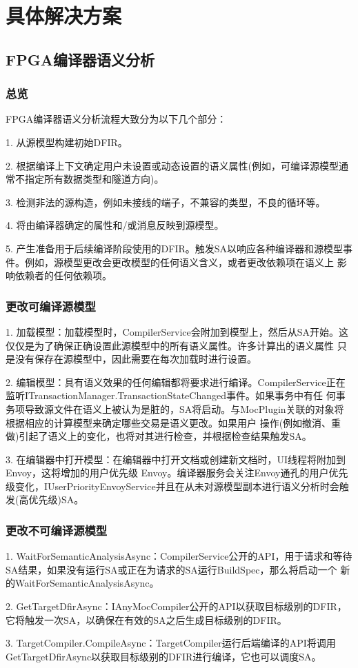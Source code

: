 \documentclass[UTF8]{ctexart}
\begin{document}
\section{具体解决方案}
\subsection{FPGA编译器语义分析}
\subsubsection{总览}
FPGA编译器语义分析流程大致分为以下几个部分：
\par
1. 从源模型构建初始DFIR。
\par
2. 根据编译上下文确定用户未设置或动态设置的语义属性(例如，可编译源模型通常不指定所有数据类型和隧道方向)。
\par
3. 检测非法的源构造，例如未接线的端子，不兼容的类型，不良的循环等。
\par
4. 将由编译器确定的属性和/或消息反映到源模型。
\par
5. 产生准备用于后续编译阶段使用的DFIR。触发SA以响应各种编译器和源模型事件。例如，源模型更改会更改模型的任何语义含义，或者更改依赖项在语义上
影响依赖者的任何依赖项。
\subsubsection{更改可编译源模型}
1. 加载模型：加载模型时，CompilerService会附加到模型上，然后从SA开始。这仅仅是为了确保正确设置此源模型中的所有语义属性。许多计算出的语义属性
只是没有保存在源模型中，因此需要在每次加载时进行设置。
\par
2. 编辑模型：具有语义效果的任何编辑都将要求进行编译。CompilerService正在监听ITransactionManager.TransactionStateChanged事件。如果事务中有任
何事务项导致源文件在语义上被认为是脏的，SA将启动。与MocPlugin关联的对象将根据相应的计算模型来确定哪些交易是语义更改。如果用户
操作(例如撤消、重做)引起了语义上的变化，也将对其进行检查，并根据检查结果触发SA。
\par
3. 在编辑器中打开模型：在编辑器中打开文档或创建新文档时，UI线程将附加到Envoy，这将增加的用户优先级 Envoy。编译器服务会关注Envoy通孔的用户优先
级变化，IUserPriorityEnvoyService并且在从未对源模型副本进行语义分析时会触发(高优先级)SA。
\subsubsection{更改不可编译源模型}
1. WaitForSemanticAnalysisAsync：CompilerService公开的API，用于请求和等待SA结果，如果没有运行SA或正在为请求的SA运行BuildSpec，那么将启动一个
新的WaitForSemanticAnalysisAsync。
\par
2. GetTargetDfirAsync：IAnyMocCompiler公开的API以获取目标级别的DFIR，它将触发一次SA，以确保在有效的SA之后生成目标级别的DFIR。
\par
3. TargetCompiler.CompileAsync：TargetCompiler运行后端编译的API将调用GetTargetDfirAsync以获取目标级别的DFIR进行编译，它也可以调度SA。
\end{document}
